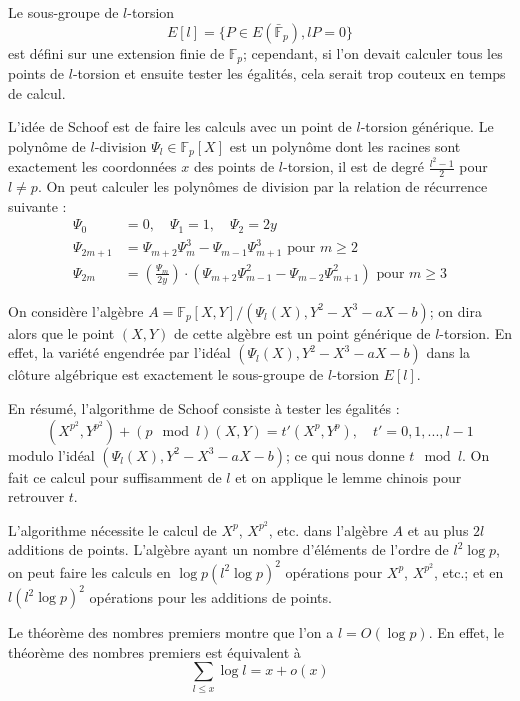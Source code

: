 \documentclass[a4paper]{article}
\theoremstyle{definition}
\theoremstyle{remark}
\numberwithin{equation}{section}
\begin{document}
Le sous-groupe de $l$-torsion
$$E[l] = \{P \in E(\bar{\mathbb{F}}_p), lP = 0\}$$
est défini sur une extension finie de $\mathbb{F}_p$; cependant, si l'on devait calculer tous les points de $l$-torsion et ensuite tester les égalités, cela serait trop couteux en temps de calcul.

L'idée de Schoof \cite{schoof} est de faire les calculs avec un point de $l$-torsion générique. Le polynôme de $l$-division $\Psi_l \in \mathbb{F}_p[X]$ est un polynôme dont les racines sont exactement les coordonnées $x$ des points de $l$-torsion, il est de degré $\frac{l^2-1}{2}$ pour $l \neq p$. On peut calculer les polynômes de division par la relation de récurrence suivante :
\begin{align*}
\Psi_{0} &= 0, \quad \Psi_{1} = 1, \quad \Psi_{2} = 2y \\
\Psi_{2m+1} &=  \Psi_{m+2} \Psi_{m}^{ 3}  -  \Psi_{m-1} \Psi ^{ 3}_{ m+1} \text{ pour } m \geq 2 \\
\Psi_{ 2m} &=  \left ( \frac { \Psi_{m}}{2y} \right ) \cdot ( \Psi_{m+2}\Psi^{ 2}_{m-1} -  \Psi_{m-2} \Psi ^{ 2}_{m+1})   \text{ pour } m \geq 3
\end{align*}

On considère l'algèbre $A=\mathbb{F}_p[X,Y]/(\Psi_l(X),Y^2-X^3-aX-b)$; on dira alors que le point $(X,Y)$ de cette algèbre est un point générique de $l$-torsion. En effet, la variété engendrée par l'idéal $(\Psi_l(X),Y^2-X^3-aX-b)$ dans la clôture algébrique est exactement le sous-groupe de $l$-torsion $E[l]$.

En résumé, l'algorithme de Schoof consiste à tester les égalités :
\begin{equation}
(X^{p^2},Y^{p^2}) + (p \mod l)(X,Y) = t'(X^p,Y^p), \quad t' = 0,1,...,l-1
\end{equation}
modulo l'idéal $(\Psi_l(X),Y^2-X^3-aX-b)$; ce qui nous donne $t \mod l$. On fait ce calcul pour suffisamment de $l$ et on applique le lemme chinois pour retrouver $t$.

L'algorithme nécessite le calcul de $X^p$, $X^{p^2}$, etc. dans l'algèbre $A$ et au plus $2l$ additions de points. L'algèbre ayant un nombre d'éléments de l'ordre de $l^2\log p$, on peut faire les calculs en $\log p(l^2\log p)^2$ opérations pour $X^p$, $X^{p^2}$, etc.; et en $l(l^2\log p)^2$ opérations pour les additions de points.

Le théorème des nombres premiers montre que l'on a $l = O(\log p)$. En effet, le théorème des nombres premiers est équivalent à
$$\sum_{l \leq x}\log l = x + o(x)$$
\end{document}
